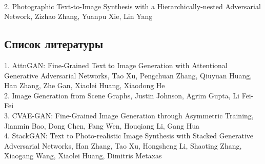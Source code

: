 \documentclass{article}
\begin{document}
\\
        2. Photographic Text-to-Image Synthesis with a Hierarchically-nested Adversarial Network, Zizhao Zhang, Yuanpu Xie, Lin Yang\\
\newpage
    \begin{center} 
    \section{Список литературы}
    \end{center} 
      \large 1. AttnGAN: Fine-Grained Text to Image Generation
with Attentional Generative Adversarial Networks,
      Tao Xu, Pengchuan Zhang, Qiuyuan Huang, Han Zhang, Zhe Gan, Xiaolei Huang, Xiaodong He\\
      2. Image Generation from Scene Graphs,
      Justin Johnson, Agrim Gupta, Li Fei-Fei\\
      3. CVAE-GAN: Fine-Grained Image Generation through Asymmetric Training, Jianmin Bao, Dong Chen, Fang Wen, Houqiang Li, Gang Hua\\
      4. StackGAN: Text to Photo-realistic Image Synthesis with Stacked Generative Adversarial Networks, Han Zhang, Tao Xu, Hongsheng Li, Shaoting Zhang, Xiaogang Wang, Xiaolei Huang, Dimitris Metaxas\\
\end{document}
